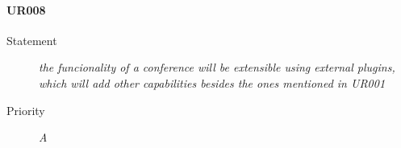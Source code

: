 \paragraph{UR008}
\begin{description}
  \item [Statement] 
    \textit{ the funcionality of a conference will be extensible using external plugins, which will add other capabilities besides the ones mentioned in UR001 }
  \item [Priority] \textit{A}
\end{description}

